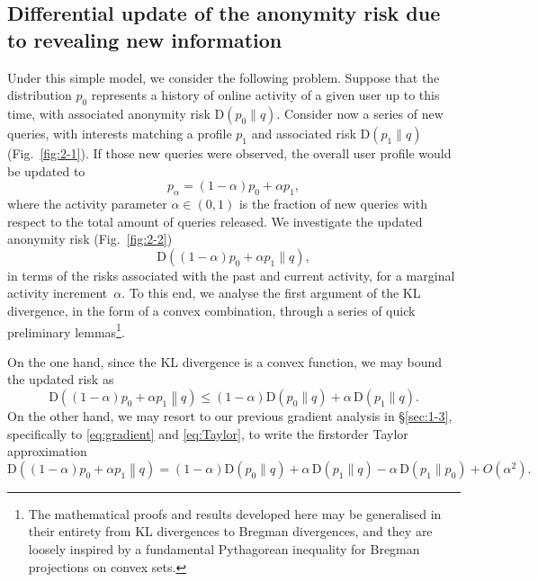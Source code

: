 \subsection{Differential update of the anonymity risk due to revealing new information}
\label{sec:1-4}

\noindent
Under this simple model, we consider the following problem. Suppose that the distribution $p_0$ represents a history of online activity of a given user up to this time, with associated anonymity risk $\mathrm{D}(p_0\|q)$. Consider now a series of new queries, with interests matching a profile $p_1$ and associated risk $\mathrm{D}(p_1\|q)$ (Fig.~\ref{fig:2-1}). If those new queries were observed, the overall user profile would be updated to
\begin{equation*}
p_\alpha = (1-\alpha)p_0+\alpha p_1,
\end{equation*}
where the activity parameter $\alpha\in(0,1)$ is the fraction of new queries with respect to the total amount of queries released. We investigate the updated anonymity risk (Fig.~\ref{fig:2-2})
\begin{equation*}
\mathrm{D}((1-\alpha)p_0+\alpha p_1\|q), 
\end{equation*}
in terms of the risks associated with the past and current activity, for a marginal activity increment~$\alpha$. To this end, we analyse the first argument of the KL divergence, in the form of a convex combination, through a series of quick preliminary lemmas\footnote{The mathematical proofs and results developed here may be generalised in their entirety from KL divergences to Bregman divergences, and they are loosely inspired by a fundamental Pythagorean inequality for Bregman projections on convex sets.}.

On the one hand, since the KL divergence is a convex function, we may bound the updated risk as
\begin{equation} \label{eq:D:convexity}
\mathrm{D}\left((1-\alpha)p_0+\alpha p_1\middle\|q\right)\leqslant(1-\alpha)\mathrm{D}(p_0\|q)+\alpha\,\mathrm{D}(p_1\|q).
\end{equation}
On the other hand, we may resort to our previous gradient analysis in \S \ref{sec:1-3}, specifically to \eqref{eq:gradient} and \eqref{eq:Taylor}, to write the first\hyph order Taylor approximation
\begin{equation} \label{eq:D:Taylor}
\mathrm{D}\left((1-\alpha)p_0+\alpha p_1\middle\|q\right)=(1-\alpha)\mathrm{D}(p_0\|q)+\alpha\,\mathrm{D}(p_1\|q)-\alpha\,\mathrm{D}(p_1\|p_0)+O(\alpha^2).
\end{equation}

